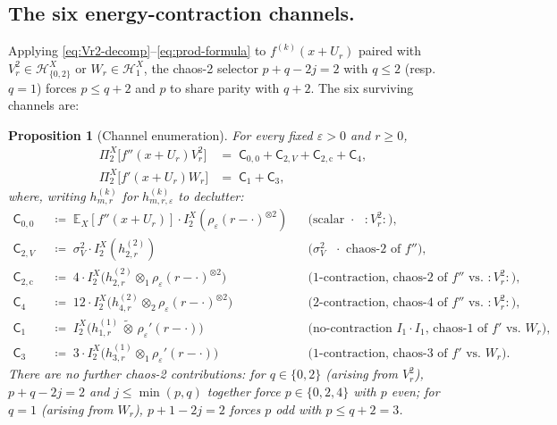 \documentclass[11pt,reqno]{amsart}
\theoremstyle{plain}
\newtheorem{proposition}[theorem]{Proposition}
\theoremstyle{definition}
\theoremstyle{remark}
\newcommand{\E}{\mathbb{E}}
\newcommand{\Hilb}{\mathcal{H}}
\newcommand{\Pir}{\Pi}
\newcommand{\Channel}[1]{\mathsf{C}_{#1}}
\begin{document}
\subsection*{The six energy-contraction channels.}
Applying \eqref{eq:Vr2-decomp}--\eqref{eq:prod-formula} to
$f^{(k)}(x+U_r)$ paired with $V_r^2\in\Hilb_{\{0,2\}}^X$ or
$W_r\in\Hilb_1^X$, the chaos-2 selector $p+q-2j=2$ with $q\le 2$
(resp.\ $q=1$) forces $p\le q+2$ and $p$ to share parity with
$q+2$. The six surviving channels are:

\begin{proposition}[Channel enumeration]\label{prop:channels}
For every fixed $\varepsilon>0$ and $r\ge 0$,
\begin{align*}
 \Pir_2^X\!\bigl[f''(x+U_r)V_r^2\bigr]
 &=\;\Channel{0,0}+\Channel{2,V}+\Channel{2,\mathrm{c}}+\Channel{4},\\
 \Pir_2^X\!\bigl[f'(x+U_r)W_r\bigr]
 &=\;\Channel{1}+\Channel{3},
\end{align*}
where, writing $h^{(k)}_{m,r}$ for $h^{(k)}_{m,r,\varepsilon}$ to
declutter:
\begin{align*}
 \Channel{0,0}\;\;&\coloneqq\;\E_X[f''(x+U_r)]\cdot I_2^X(\rho_\varepsilon(r-\cdot)^{\otimes 2})
   &&\text{(scalar $\cdot$ $:V_r^2:$),}\\
 \Channel{2,V}&\coloneqq\;\sigma_V^2\cdot I_2^X(h^{(2)}_{2,r})
   &&\text{($\sigma_V^2$ $\cdot$ chaos-2 of $f''$),}\\
 \Channel{2,\mathrm{c}}&\coloneqq\;4\cdot I_2^X\bigl(h^{(2)}_{2,r}\otimes_1\rho_\varepsilon(r-\cdot)^{\otimes 2}\bigr)
   &&\text{(1-contraction, chaos-2 of $f''$ vs.\ $:V_r^2:$),}\\
 \Channel{4}&\coloneqq\;12\cdot I_2^X\bigl(h^{(2)}_{4,r}\otimes_2\rho_\varepsilon(r-\cdot)^{\otimes 2}\bigr)
   &&\text{(2-contraction, chaos-4 of $f''$ vs.\ $:V_r^2:$),}\\
 \Channel{1}&\coloneqq\;I_2^X\bigl(h^{(1)}_{1,r}\,\widetilde\otimes\,\rho_\varepsilon'(r-\cdot)\bigr)
   &&\text{(no-contraction $I_1\cdot I_1$, chaos-1 of $f'$ vs.\ $W_r$),}\\
 \Channel{3}&\coloneqq\;3\cdot I_2^X\bigl(h^{(1)}_{3,r}\otimes_1\rho_\varepsilon'(r-\cdot)\bigr)
   &&\text{(1-contraction, chaos-3 of $f'$ vs.\ $W_r$).}
\end{align*}
There are no further chaos-2 contributions: for $q\in\{0,2\}$
(arising from $V_r^2$), $p+q-2j=2$ and $j\le\min(p,q)$ together
force $p\in\{0,2,4\}$ with $p$ even; for $q=1$ (arising from $W_r$),
$p+1-2j=2$ forces $p$ odd with $p\le q+2=3$.
\end{proposition}
\end{document}

